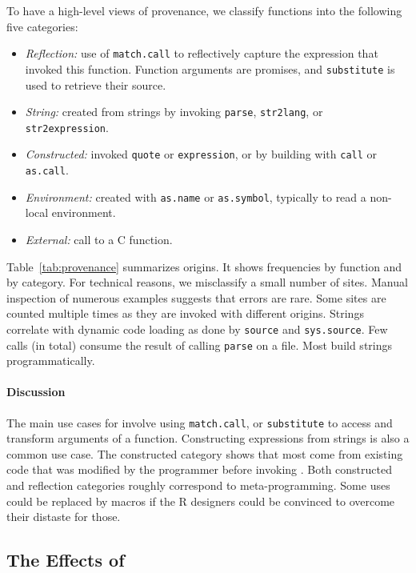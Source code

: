 \documentclass[acmsmall, screen]{acmart}
\renewcommand{\k}[1]{\lstinline |#1|\xspace}
\begin{document}
To have a high-level views of provenance, we classify functions into the
following five categories:

\begin{itemize}[---]
\item {\it Reflection:} use of \k{match.call} to reflectively capture the
  expression that invoked this function. Function arguments are promises, and
  \k{substitute} is used to retrieve their source.
\item {\it String:} created from strings by invoking \k{parse},
  \k{str2lang}, or \k{str2expression}.
\item {\it Constructed:} invoked \k{quote} or \k{expression}, or by building with
  \k{call} or \k{as.call}.
\item {\it Environment: } created with \k{as.name} or \k{as.symbol}, typically
  to read a non-local environment.
\item {\it External: }  call to a C function.
\end{itemize}

Table~\ref{tab:provenance} summarizes origins. It shows frequencies by function
and by category. For technical reasons, we misclassify a small number of sites.
Manual inspection of numerous examples suggests that errors are rare. Some sites
are counted multiple times as they are invoked with different origins. Strings
correlate with dynamic code loading as done by \k{source} and \k{sys.source}.
Few calls (\packageNbParseFromFileSites in total) consume the result of calling
\k{parse} on a file. Most build strings programmatically.


\paragraph{Discussion}
The main use cases for \eval involve using \k{match.call}, or \k{substitute} to access and transform arguments of a function. Constructing
expressions from strings is also a common use case. The constructed category
shows that most \evals come from existing code that was modified by the
programmer before invoking \eval. Both constructed and reflection categories
roughly correspond to meta-programming. Some uses could be replaced by
macros if the R designers could be convinced to overcome their distaste for
those.

\subsection{The Effects of \Eval}
\end{document}
